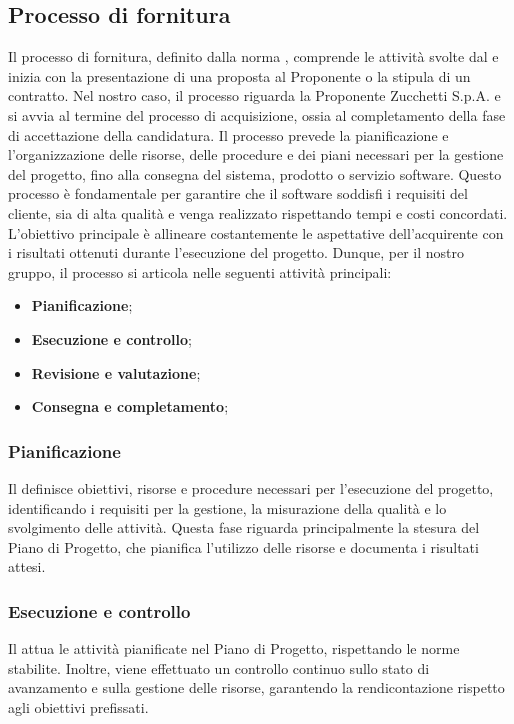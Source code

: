 \subsection{Processo di fornitura}
\label{subsection:processo_fornitura}
Il processo di fornitura, definito dalla norma , comprende le attività svolte dal  e inizia con la presentazione di una proposta al Proponente o la stipula di un contratto. Nel nostro caso, il processo riguarda la Proponente Zucchetti S.p.A. e si avvia al termine del processo di acquisizione, ossia al completamento della fase di accettazione della candidatura.
Il processo prevede la pianificazione e l’organizzazione delle risorse, delle procedure e dei piani necessari per la gestione del progetto, fino alla consegna del sistema, prodotto o servizio software. Questo processo è fondamentale per garantire che il software soddisfi i requisiti del cliente, sia di alta qualità e venga realizzato rispettando tempi e costi concordati. L’obiettivo principale è allineare costantemente le aspettative dell’acquirente con i risultati ottenuti durante l’esecuzione del progetto.
Dunque, per il nostro gruppo, il processo si articola nelle seguenti attività principali:
\begin{itemize}
    \item \textbf{Pianificazione};
    \item \textbf{Esecuzione e controllo};
    \item \textbf{Revisione e valutazione};
    \item \textbf{Consegna e completamento};
\end{itemize}

\subsubsection{Pianificazione}
Il  definisce obiettivi, risorse e procedure necessari per l’esecuzione del progetto, identificando i requisiti per la gestione, la misurazione della qualità e lo svolgimento delle attività. Questa fase riguarda principalmente la stesura del Piano di Progetto, che pianifica l’utilizzo delle risorse e documenta i risultati attesi.

\subsubsection{Esecuzione e controllo}
Il  attua le attività pianificate nel Piano di Progetto, rispettando le norme stabilite. Inoltre, viene effettuato un controllo continuo sullo stato di avanzamento e sulla gestione delle risorse, garantendo la rendicontazione rispetto agli obiettivi prefissati. 

